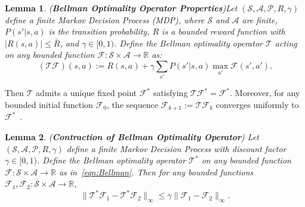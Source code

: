 \documentclass{article}
\newcommand{\mc}{\mathcal}
\newtheorem{lemma}{Lemma}
\begin{document}
\begin{lemma}(\textbf{Bellman Optimality Operator Properties})\label{lemma:Bellman}
Let $(\mathcal{S}, \mathcal{A}, \mc{P}, R, \gamma)$ define a finite Markov Decision Process (MDP), where $\mathcal{S}$ and $\mathcal{A}$ are finite, $P(s' \lvert s, a)$ is the transition probability, $R$ is a bounded reward function with $|R(s,a)| \leq \bar{R}$, and $\gamma \in [0,1)$. Define the Bellman optimality operator $\mathcal{T}$ acting on any bounded function $\mc{F} : \mathcal{S} \times \mathcal{A} \to \mathbb{R}$ as:
\begin{equation}\label{eqn:Bellman}
(\mathcal{T} \mc{F})(s,a) := R(s,a) + \gamma \sum_{s'} P(s' \lvert s,a) \max_{a'} \mc{F}(s', a').
\end{equation}
\end{lemma}
Then $\mathcal{T}$ admits a unique fixed point $\mc{F}^*$ satisfying $\mathcal{T} \mc{F}^* = \mc{F}^*$. Moreover, for any bounded initial function $\mc{F}_0$, the sequence $\mc{F}_{k+1} := \mathcal{T} \mc{F}_k$ converges uniformly to $\mc{F}^*$~\cite{suttonRL}.

\begin{lemma}(\textbf{Contraction of Bellman Optimality Operator})
Let $(\mathcal{S}, \mathcal{A}, \mc{P}, R, \gamma)$ define a finite Markov Decision Process with discount factor $\gamma \in [0,1)$. Define the Bellman optimality operator $\mathcal{T}^*$ on any bounded function $\mc{F} : \mathcal{S} \times \mathcal{A} \to \mathbb{R}$ as in~\eqref{eqn:Bellman}. Then for any bounded functions $\mc{F}_1, \mc{F}_2 : \mathcal{S} \times \mathcal{A} \to \mathbb{R}$,
\begin{equation}\label{eqn:Bellmancontraction}
\| \mathcal{T}^* \mc{F}_1 - \mathcal{T}^* \mc{F}_2 \|_\infty \leq \gamma \| \mc{F}_1 - \mc{F}_2 \|_\infty.
\end{equation}
\end{lemma}
\end{document}
